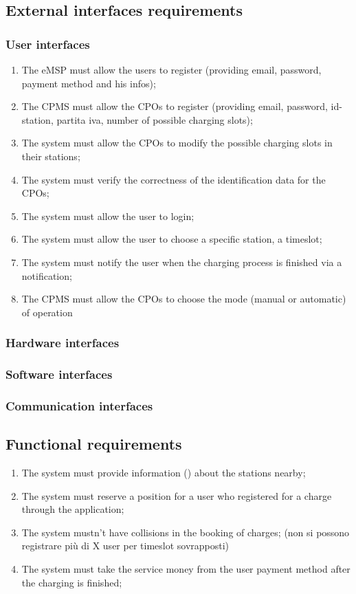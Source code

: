 \subsection{External interfaces requirements}
\subsubsection{User interfaces}
\begin{enumerate}[label=\textbf{R\arabic*}]
    \item The \ac{eMSP} must allow the users to register (providing email, password, payment method and his infos);
    \item The \ac{CPMS} must allow the \acp{CPO} to register (providing email, password, id-station, partita iva, number of possible charging slots);
    \item The system must allow the \acp{CPO} to modify the possible charging slots in their stations;
    \item The system must verify the correctness of the identification data for the \acp{CPO};
    \item The system must allow the user to login;
    \item The system must allow the user to choose a specific station, a timeslot;
    \item The system must notify the user when the charging process is finished via a notification;
    \item The \ac{CPMS} must allow the \acp{CPO} to choose the mode (manual or automatic) of operation
\end{enumerate}
\subsubsection{Hardware interfaces}
\subsubsection{Software interfaces}
\subsubsection{Communication interfaces}

\subsection{Functional requirements}

\begin{enumerate}[label=\textbf{R\arabic*}]
    \item The system must provide information () about the stations nearby;
    \item The system must reserve a position for a user who registered for a charge through the application;
    \item The system mustn't have collisions in the booking of charges; (non si possono registrare più di X user per timeslot sovrapposti)
    \item The system must take the service money from the user payment method after the charging is finished;
\end{enumerate}
\clearpage
